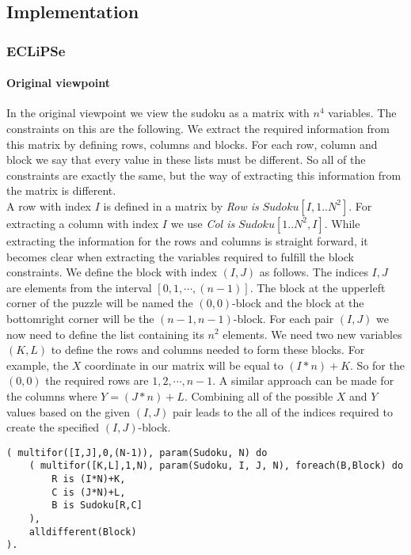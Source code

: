 \subsection{Implementation}
\subsubsection{ECLiPSe}
\paragraph*{Original viewpoint}
In the original viewpoint we view the sudoku as a matrix with $n^{4}$ variables.
The constraints on this are the following.
We extract the required information from this matrix by defining rows, columns and blocks.
For each row, column and block we say that every value in these lists must be different.
So all of the constraints are exactly the same, but the way of extracting this information from the matrix is different.\\

A row with index $I$ is defined in a matrix by \textit{Row is} $Sudoku[I,1..N^{2}]$. 
For extracting a column with index $I$ we use \textit{Col is } $Sudoku[1..N^{2},I]$.
While extracting the information for the rows and columns is straight forward, it becomes clear when extracting the variables required to fulfill the block constraints.
We define the block with index $(I,J)$ as follows. 
The indices $I, J$ are elements from the interval $[0,1,\cdots,(n-1)]$.
The block at the upperleft corner of the puzzle will be named the $(0,0)$-block and the block at the bottomright corner will be the $(n-1,n-1)$-block.
For each pair $(I,J)$ we now need to define the list containing its $n^{2}$ elements.
We need two new variables $(K,L)$ to define the rows and columns needed to form these blocks.
For example, the $X$ coordinate in our matrix will be equal to $(I*n)+K$. 
So for the $(0,0)$ the required rows are $1,2,\cdots,n-1$.
A similar approach can be made for the columns where $Y = (J*n)+L$.
Combining all of the possible $X$ and $Y$ values based on the given $(I,J)$ pair leads to the all of the indices required to create the specified $(I,J)$-block.

\begin{lstlisting}
( multifor([I,J],0,(N-1)), param(Sudoku, N) do
	( multifor([K,L],1,N), param(Sudoku, I, J, N), foreach(B,Block) do
		R is (I*N)+K,
		C is (J*N)+L,
		B is Sudoku[R,C]
	),
	alldifferent(Block)
).
\end{lstlisting}

